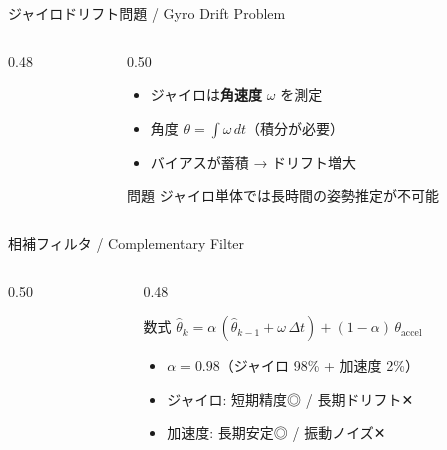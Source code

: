\documentclass[aspectratio=169, 14pt]{beamer}
\begin{document}
\begin{frame}{ジャイロドリフト問題 / Gyro Drift Problem}
  \begin{columns}[c]
    \begin{column}{0.48\textwidth}
      \centering
      \resizebox{\linewidth}{!}{}
    \end{column}
    \begin{column}{0.50\textwidth}
      \begin{itemize}
        \item ジャイロは\textbf{角速度} $\omega$ を測定
        \item 角度 $\theta = \int \omega\,dt$（積分が必要）
        \item バイアスが蓄積 → ドリフト増大
      \end{itemize}
      \vspace{0.5em}
      \begin{alertblock}{問題}
        ジャイロ単体では長時間の姿勢推定が不可能
      \end{alertblock}
    \end{column}
  \end{columns}
\end{frame}

\begin{frame}{相補フィルタ / Complementary Filter}
  \begin{columns}[c]
    \begin{column}{0.50\textwidth}
      \centering
      \resizebox{\linewidth}{!}{}
    \end{column}
    \begin{column}{0.48\textwidth}
      \begin{block}{数式}
        $\hat{\theta}_k = \alpha\,(\hat{\theta}_{k-1} + \omega\,\Delta t) + (1-\alpha)\,\theta_{\mathrm{accel}}$
      \end{block}

      \vspace{0.3em}

      \begin{itemize}
        \item $\alpha = 0.98$（ジャイロ 98\% + 加速度 2\%）
        \item ジャイロ: 短期精度◎ / 長期ドリフト✕
        \item 加速度: 長期安定◎ / 振動ノイズ✕
      \end{itemize}
    \end{column}
  \end{columns}
\end{frame}
\end{document}
